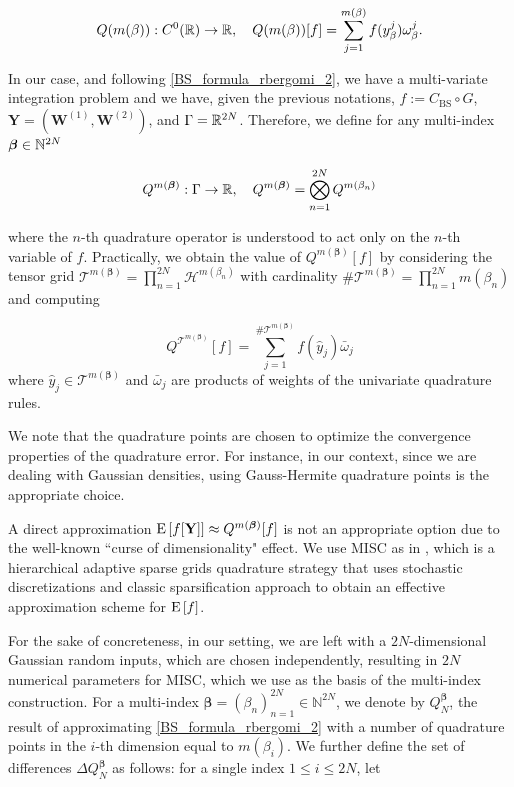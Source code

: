 \begin{equation}
Q(m(\beta)):C^0(\mathbb{R}) \rightarrow \mathbb{R}, \quad Q(m(\beta))[f]= \sum_{j=1}^{m(\beta)} f(y^j_\beta) \omega_\beta^j.
\end{equation}





In our case, and following \eqref{BS_formula_rbergomi_2}, we have a multi-variate integration problem and  we have, given the previous notations,    $f:=C_{\text{BS}}\circ G$, $\mathbf{Y}=(\mathbf{W}^{(1)},\mathbf{W}^{(2)})$, and  $\Gamma=\mathbb{R}^{2N}$.  Therefore,  we define for any multi-index $\boldsymbol{\beta} \in \mathbb{N}^{2N}$

$$Q^{m(\boldsymbol{\beta})}: \Gamma \rightarrow \mathbb{R},\quad  Q^{m(\boldsymbol{\beta})}= \bigotimes_{n = 1}^{2N} Q^{m(\beta_n)} $$

where the $n$-th quadrature operator is understood to act only on the $n$-th variable of $f$. Practically, we obtain the value of $Q^{m(\boldsymbol{\beta})}[f]$  by considering the tensor grid $\mathcal{T}^{m(\boldsymbol{\beta})}= \prod_{n = 1}^{2N}  \mathcal{H}^{m(\beta_n)}$ with cardinality $\#\mathcal{T}^{m(\boldsymbol{\beta})}=\prod_{n=1}^{2N} m (\beta_n)$ and computing

$$ Q^{\mathcal{T}^{m(\boldsymbol{\beta})}}[f]= \sum_{j=1}^{\#\mathcal{T}^{m(\boldsymbol{\beta})}} f(\hat{y}_j) \bar{\omega}_j$$
where $\hat{y}_j \in \mathcal{T}^{m(\boldsymbol{\beta})}$ and $\bar{\omega}_j$ are  products of weights of the univariate quadrature rules.
\begin{remark}
We note that the quadrature points are chosen to optimize the convergence properties of the quadrature error.  For instance, in our context, since we are dealing with Gaussian densities, using Gauss-Hermite quadrature points is the appropriate choice.
\end{remark}

A direct approximation $\mathrm{E}\left[f[\mathbf{Y}]\right] \approx Q^{m(\boldsymbol{\beta})}[f]$ is not an appropriate option  due to the well-known ``curse of dimensionality" effect. We use MISC as in \cite{haji2016multi}, which is a hierarchical adaptive sparse grids quadrature strategy that uses  stochastic discretizations  and classic sparsification approach to obtain an effective approximation scheme for $\mathrm{E}\left[f\right]$. 

 For the sake
of concreteness, in our setting, we are left with a $2N$-dimensional Gaussian random inputs, which are chosen independently, resulting in  $2N$ numerical parameters for MISC, which we use as the basis of the multi-index construction. For a multi-index $\boldsymbol{\beta} = (\beta_n)_{n=1}^{2N} \in \mathbb{N}^{2N}$, we denote  by
$Q_N^{\boldsymbol{\beta}}$,   the result of approximating \eqref{BS_formula_rbergomi_2} with a number of quadrature points  in the $i$-th dimension equal to  $m(\beta_i)$. We further define the set of
differences $\Delta Q_N^{\boldsymbol{\beta}}$ as follows: for a single index $1 \le i \le 2N$,
let

